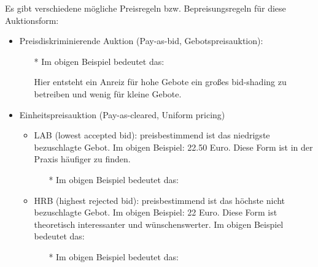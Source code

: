 \documentclass[12pt]{extreport} %
\theoremstyle{named}
\theoremstyle{nnamed}
\theoremstyle{itshape}
\theoremstyle{normal}
\begin{document}
Es gibt verschiedene mögliche Preisregeln bzw. Bepreisungsregeln für diese Auktionsform:
\begin{itemize}
	\item Preisdiskriminierende Auktion (Pay-as-bid, Gebotspreisauktion): 
		\begin{itemize}
			\item[*] Im obigen Beispiel bedeutet das:
			Hier entsteht ein Anreiz für hohe Gebote ein großes bid-shading zu betreiben und wenig für kleine Gebote.
		\end{itemize}
	\item Einheitspreisauktion (Pay-as-cleared, Uniform pricing)
		\begin{itemize}
			\item LAB (lowest accepted bid): preisbestimmend ist das niedrigste bezuschlagte Gebot. Im obigen Beispiel: 22.50 Euro. Diese Form ist in der Praxis häufiger zu finden.
				\begin{itemize}
					\item[*] Im obigen Beispiel bedeutet das:
				\end{itemize}
			\item HRB (highest rejected bid): preisbestimmend ist das höchste nicht bezuschlagte Gebot. Im obigen Beispiel: 22 Euro. Diese Form ist theoretisch interessanter und wünschenswerter. 
				Im obigen Beispiel bedeutet das:
				\begin{itemize}
					\item[*] Im obigen Beispiel bedeutet das:
\end{itemize}
\end{itemize}
\end{itemize}
\end{document}
